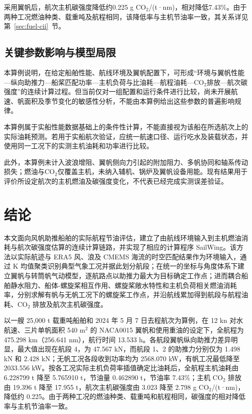\documentclass[UTF8,a4paper,twoside,zihao=5,fontset=windows]{ctexart}
\begin{document}
采用翼帆后，航次主机碳强度降低约0.225 g CO$_2$/(t·nm)，相对降低7.43\%。由于两种工况燃油种类、载重吨及航程相同，该降低率与主机节油率一致，其关系详见第~\ref{sec:fuel-cii}~节。

\subsection{关键参数影响与模型局限}

本算例说明，在给定船舶性能、航线环境及翼帆配置下，可形成“环境与翼帆性能—纵向助推力—船桨匹配功率—主机负荷与比油耗—航程油耗—CO$_2$排放—航次碳强度”的连续计算过程。但当前仅对一组配置和运行条件进行比较，尚未开展航速、帆面积及季节变化的敏感性分析，不能由本算例给出这些参数的普遍影响规律。

本算例属于实船性能数据基础上的条件性计算，不能直接视为该船在所选航次上的实际油耗预测。若用于实船航次验证，应统一航速口径、运行吃水及装载状态，并使用同一工况下的实测主机油耗和功率进行比较。

此外，本算例未计入波浪增阻、翼帆侧向力引起的附加阻力、多帆协同和轴系传动损失；燃油与CO$_2$仅覆盖主机，未纳入辅机、锅炉及翼帆设备用能。现有结果用于评价所设定航次的主机燃油及碳强度变化，不代表已经完成实测误差验证。

\section{结论}
\label{sec:conclusion}

本文面向风帆助推船舶的实际航程节油评估，建立了由航线环境输入到主机燃油消耗与航次碳强度估算的连续计算链路，并实现了相应的计算程序 SailWing。该方法以实际航迹与 ERA5 风、浪及 CMEMS 海流的时空匹配结果作为环境输入，通过 K 均值聚类识别典型气象工况并据此划分航段；在统一的坐标与角度体系下建立翼帆与转筒帆气动模型，逐航路点以助推力最大为目标确定工作点；进而耦合船舶静水阻力、船体-螺旋桨相互作用、螺旋桨敞水特性和主机负荷相关燃油消耗率，分别求解有帆与无帆工况下的螺旋桨工作点，并沿航线累加得到航段与航程油耗、CO$_2$ 排放及航次主机碳强度。

以一艘 25,000 t 载重吨船舶和 2024 年 5 月 7 日去程航次为算例，在 12 kn 对水航速、三片单帆面积 540 m$^2$ 的 NACA0015 翼帆和使用重油的设定下，全航程为 475.298 km（256.641 nm），航行时间 13.533 h。各航段翼帆纵向助推力差异明显，最大值出现在航段 4，为 47.567 kN，而航段 1、2 的助推力分别仅为 1.498 kN 和 2.428 kN；无帆工况各段收到功率均为 2568.070 kW，有帆工况最低降至 2033.556 kW。按各工况实际主机负荷率插值确定比油耗后，全航程主机油耗由 6.228799 t 降至 5.765910 t，节油量 0.462890 t，节油率 7.43\%；主机 CO$_2$ 排放由 19.396 t 降至 17.955 t，航次主机碳强度由 3.023 降至 2.798 g CO$_2$/(t·nm)，降低约 0.225。由于两种工况的燃油种类、载重吨和航程相同，碳强度的相对降低率与主机节油率一致。
\end{document}
